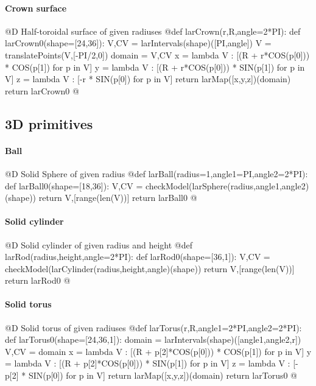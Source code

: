 \documentclass[11pt,oneside]{article}	%
\begin{document}
\paragraph{Crown surface}
@D Half-toroidal surface of given radiuses
@{def larCrown(r,R,angle=2*PI):
	def larCrown0(shape=[24,36]):
		V,CV = larIntervals(shape)([PI,angle])
		V = translatePoints(V,[-PI/2,0])
		domain = V,CV
		x = lambda V : [(R + r*COS(p[0])) * COS(p[1]) for p in V]
		y = lambda V : [(R + r*COS(p[0])) * SIN(p[1]) for p in V]
		z = lambda V : [-r * SIN(p[0]) for p in V]
		return larMap([x,y,z])(domain)
	return larCrown0
@}

\subsection{3D primitives}

\paragraph{Ball}
@D Solid Sphere of given radius
@{def larBall(radius=1,angle1=PI,angle2=2*PI):
	def larBall0(shape=[18,36]):
		V,CV = checkModel(larSphere(radius,angle1,angle2)(shape))
		return V,[range(len(V))]
	return larBall0
@}

\paragraph{Solid cylinder}
@D Solid cylinder of given radius and height
@{def larRod(radius,height,angle=2*PI):
	def larRod0(shape=[36,1]):
		V,CV = checkModel(larCylinder(radius,height,angle)(shape))
		return V,[range(len(V))]
	return larRod0
@}

\paragraph{Solid torus}
@D Solid torus of given radiuses
@{def larTorus(r,R,angle1=2*PI,angle2=2*PI):
	def larTorus0(shape=[24,36,1]):
		domain = larIntervals(shape)([angle1,angle2,r])
		V,CV = domain
		x = lambda V : [(R + p[2]*COS(p[0])) * COS(p[1]) for p in V]
		y = lambda V : [(R + p[2]*COS(p[0])) * SIN(p[1]) for p in V]
		z = lambda V : [-p[2] * SIN(p[0]) for p in V]
		return larMap([x,y,z])(domain)
	return larTorus0
@}
\end{document}
